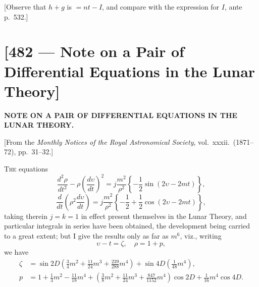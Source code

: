 \documentclass[11pt,a4paper]{article}
\theoremstyle{plain}
\theoremstyle{definition}
\theoremstyle{remark}
\begin{document}
[Observe that $h+g$ is $=nt-I$, and compare with the expression for $I$, ante p.~532.]


\vspace{2em}

\newpage
\section*{[482 --- Note on a Pair of Differential Equations in the Lunar Theory]}


\begin{center}
\textbf{NOTE ON A PAIR OF DIFFERENTIAL EQUATIONS IN THE LUNAR THEORY.}
\end{center}

[From the \textit{Monthly Notices of the Royal Astronomical Society}, vol.\ xxxii.\ (1871--72), pp.\ 31--32.]

\bigskip

\textsc{The} equations
\[
\frac{d^{2}\rho}{dt^{2}}-\rho\left(\frac{d\upsilon}{dt}\right)^{2}=j\frac{m^{2}}{\rho^{2}}\left\{-\frac12 \sin(2\upsilon-2mt)\right\},
\]
\[
\frac{d}{dt}\left(\rho^{2}\frac{d\upsilon}{dt}\right)=j\frac{m^{2}}{\rho^{2}}\left\{-\frac12 + \frac12 \cos(2\upsilon-2mt)\right\},
\]
taking therein $j=k=1$ in effect present themselves in the Lunar Theory, and particular integrals in series have been obtained, the development being carried to a great extent; but I give the results only as far as $m^{6}$, viz., writing
\[
\upsilon-t=\zeta, \quad \rho=1+p,
\]
we have
\begin{align*}
\zeta &= \sin 2D\left(\tfrac34 m^{2} + \tfrac{11}{24}m^{3} + \tfrac{239}{288}m^{4}\right) + \sin 4D\left(\tfrac{1}{48}m^{4}\right),\\
p &= 1 + \tfrac13 m^{2} - \tfrac{11}{18}m^{4} + \left(\tfrac{3}{8}m^{2} + \tfrac{11}{24}m^{3} + \tfrac{847}{1152}m^{4}\right)\cos 2D + \tfrac{1}{16}m^{4}\cos 4D.
\end{align*}
\end{document}
